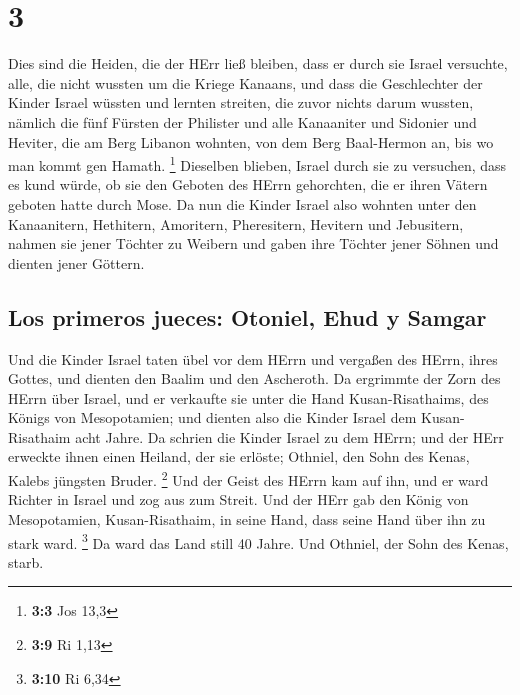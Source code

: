 \hypertarget{section-2}{%
\section{3}\label{section-2}}

 Dies sind die Heiden, die der HErr ließ bleiben, dass er
durch sie Israel versuchte, alle, die nicht wussten um die Kriege
Kanaans,  und dass die Geschlechter der Kinder Israel
wüssten und lernten streiten, die zuvor nichts darum wussten,
 nämlich die fünf Fürsten der Philister und alle
Kanaaniter und Sidonier und Heviter, die am Berg Libanon wohnten, von
dem Berg Baal-Hermon an, bis wo man kommt gen Hamath. \footnote{\textbf{3:3}
  Jos 13,3}  Dieselben blieben, Israel durch sie zu
versuchen, dass es kund würde, ob sie den Geboten des HErrn gehorchten,
die er ihren Vätern geboten hatte durch Mose.  Da nun die
Kinder Israel also wohnten unter den Kanaanitern, Hethitern, Amoritern,
Pheresitern, Hevitern und Jebusitern,  nahmen sie jener
Töchter zu Weibern und gaben ihre Töchter jener Söhnen und dienten jener
Göttern.

\hypertarget{los-primeros-jueces-otoniel-ehud-y-samgar}{%
\subsection{Los primeros jueces: Otoniel, Ehud y
Samgar}\label{los-primeros-jueces-otoniel-ehud-y-samgar}}

 Und die Kinder Israel taten übel vor dem HErrn und
vergaßen des HErrn, ihres Gottes, und dienten den Baalim und den
Ascheroth.  Da ergrimmte der Zorn des HErrn über Israel,
und er verkaufte sie unter die Hand Kusan-Risathaims, des Königs von
Mesopotamien; und dienten also die Kinder Israel dem Kusan-Risathaim
acht Jahre.  Da schrien die Kinder Israel zu dem HErrn;
und der HErr erweckte ihnen einen Heiland, der sie erlöste; Othniel, den
Sohn des Kenas, Kalebs jüngsten Bruder. \footnote{\textbf{3:9} Ri 1,13}
 Und der Geist des HErrn kam auf ihn, und er ward Richter
in Israel und zog aus zum Streit. Und der HErr gab den König von
Mesopotamien, Kusan-Risathaim, in seine Hand, dass seine Hand über ihn
zu stark ward. \footnote{\textbf{3:10} Ri 6,34}  Da ward
das Land still 40 Jahre. Und Othniel, der Sohn des Kenas, starb.

